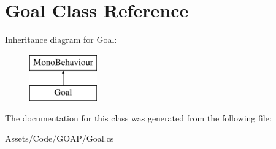 \hypertarget{class_goal}{}\section{Goal Class Reference}
\label{class_goal}
Inheritance diagram for Goal\+:\begin{figure}[H]
\begin{center}
\leavevmode
\includegraphics[height=2.000000cm]{class_goal}
\end{center}
\end{figure}


The documentation for this class was generated from the following file\+:\begin{DoxyCompactItemize}
\item 
Assets/\+Code/\+G\+O\+A\+P/Goal.\+cs\end{DoxyCompactItemize}
